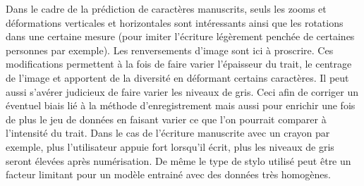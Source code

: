 Dans le cadre de la prédiction de caractères manuscrits, seuls les zooms et 
déformations verticales et horizontales sont intéressants ainsi que les rotations dans une 
certaine mesure (pour imiter l'écriture légèrement penchée de certaines personnes par 
exemple). Les renversements d'image sont ici à proscrire. Ces modifications 
permettent à la fois de faire varier l'épaisseur du trait, le centrage de l'image et 
apportent de la diversité en déformant certains caractères. Il peut aussi s'avérer judicieux
de faire varier les niveaux de gris. Ceci afin de corriger un éventuel biais lié à la 
méthode d'enregistrement mais aussi pour enrichir une fois de plus le jeu de données en 
faisant varier ce que l'on pourrait comparer à l'intensité du trait. Dans le cas de 
l'écriture manuscrite avec un crayon par exemple, plus l'utilisateur appuie fort lorsqu'il 
écrit, plus les niveaux de gris seront élevées après numérisation. De même le type de 
stylo utilisé peut être un facteur limitant pour un modèle entrainé avec des données
très homogènes.
